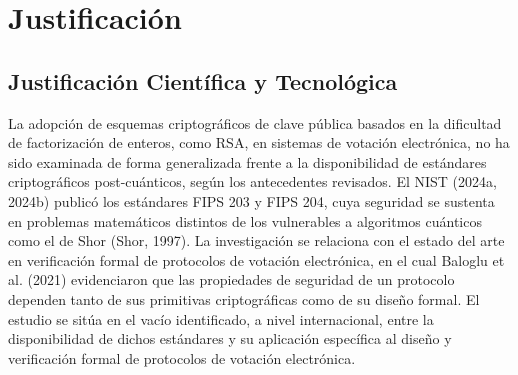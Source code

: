\section{Justificación}

\subsection{Justificación Científica y Tecnológica}
La adopción de esquemas criptográficos de clave pública basados en la dificultad de factorización de enteros, como RSA, en sistemas de votación electrónica, no ha sido examinada de forma generalizada frente a la disponibilidad de estándares criptográficos post-cuánticos, según los antecedentes revisados. El NIST (2024a, 2024b) publicó los estándares FIPS 203 y FIPS 204, cuya seguridad se sustenta en problemas matemáticos distintos de los vulnerables a algoritmos cuánticos como el de Shor (Shor, 1997). La investigación se relaciona con el estado del arte en verificación formal de protocolos de votación electrónica, en el cual Baloglu et al. (2021) evidenciaron que las propiedades de seguridad de un protocolo dependen tanto de sus primitivas criptográficas como de su diseño formal. El estudio se sitúa en el vacío identificado, a nivel internacional, entre la disponibilidad de dichos estándares y su aplicación específica al diseño y verificación formal de protocolos de votación electrónica.


